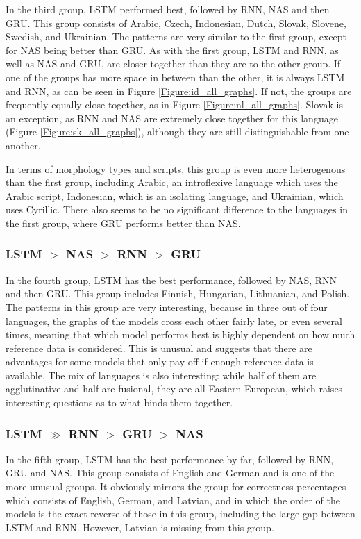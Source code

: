 \documentclass[11pt,a4paper,twoside,openright]{scrbook}
\begin{document}
In the third group, LSTM performed best, followed by RNN, NAS and then GRU. This group consists of Arabic, Czech, Indonesian, Dutch, Slovak, Slovene, Swedish, and Ukrainian. The patterns are very similar to the first group, except for NAS being better than GRU. As with the first group, LSTM and RNN, as well as NAS and GRU, are closer together than they are to the other group. If one of the groups has more space in between than the other, it is always LSTM and RNN, as can be seen in Figure \ref{Figure:id_all_graphs}. If not, the groups are frequently equally close together, as in Figure \ref{Figure:nl_all_graphs}. Slovak is an exception, as RNN and NAS are extremely close together for this language (Figure \ref{Figure:sk_all_graphs}), although they are still distinguishable from one another. 

In terms of morphology types and scripts, this group is even more heterogenous than the first group, including Arabic, an introflexive language which uses the Arabic script, Indonesian, which is an isolating language, and Ukrainian, which uses Cyrillic. There also seems to be no significant difference to the languages in the first group, where GRU performs better than NAS. 

\subsubsection{LSTM $>$ NAS $>$ RNN $>$ GRU}
In the fourth group, LSTM has the best performance, followed by NAS,  RNN and then GRU. This group includes Finnish, Hungarian, Lithuanian, and Polish. The patterns in this group are very interesting, because in three out of four languages, the graphs of the models cross each other fairly late, or even several times, meaning that which model performs best is highly dependent on how much reference data is considered. This is unusual and suggests that there are advantages for some models that only pay off if enough reference data is available. The mix of languages is also interesting: while half of them are agglutinative and half are fusional, they are all Eastern European, which raises interesting questions as to what binds them together. 

\subsubsection{LSTM $\gg$ RNN $>$ GRU $>$ NAS}
In the fifth group, LSTM has the best performance by far, followed by RNN, GRU and NAS. This group consists of English and German and is one of the more unusual groups. It obviously mirrors the group for correctness percentages which consists of English, German, and Latvian, and in which the order of the models is the exact reverse of those in this group, including the large gap between LSTM and RNN. However, Latvian is missing from this group. 
\end{document}
